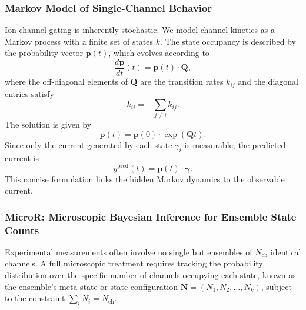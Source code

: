 \documentclass[9pt]{elife}
\begin{document}
	\subsubsection{Markov Model of Single-Channel Behavior}\label{SingleChannel Behavior}
	
	Ion channel gating is inherently stochastic. We model channel kinetics as a Markov process with a finite set of states \(k\). The state occupancy is described by the probability vector \(\boldsymbol{p}(t)\), which evolves according to
	\begin{equation}
		\frac{d\boldsymbol{p}}{dt}(t) = \boldsymbol{p}(t)\cdot \boldsymbol{Q},
		\label{eq:master_equation_short}
	\end{equation}
	where the off-diagonal elements of \(\boldsymbol{Q}\) are the transition rates \(k_{ij}\) and the diagonal entries satisfy
	\begin{equation}
		k_{ii} = -\sum_{j\neq i} k_{ij}.
		\label{eq:Q_diag_short}
	\end{equation}
	The solution is given by
	\begin{equation}
		\boldsymbol{p}(t) = \boldsymbol{p}(0) \cdot \exp(\boldsymbol{Q}t).
		\label{eq:master equation solution}
	\end{equation}
	Since only the current generated by each state \(\gamma_i\) is measurable, the predicted current is
	\begin{equation}
		y^{\text{pred}}(t) = \boldsymbol{p}(t)\cdot \boldsymbol{\gamma}.
		\label{eq:current_pred_short}
	\end{equation}
	This concise formulation links the hidden Markov dynamics to the observable current.
	
	\subsubsection{MicroR: Microscopic Bayesian Inference for Ensemble State Counts}
	
	Experimental measurements often involve no single but ensembles of \(N_{\text{ch}}\) identical channels. A full microscopic treatment requires tracking the probability distribution over the specific number of channels occupying each state, known as the ensemble's meta-state or state configuration \( \boldsymbol{N} = (N_1, N_2, \dots, N_k) \), subject to the constraint \( \sum_i N_i = N_{\text{ch}} \).
	
\end{document}
